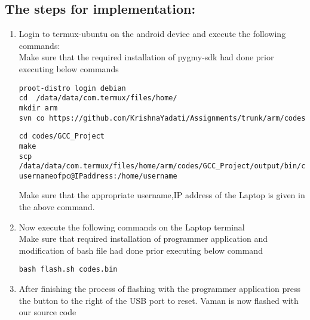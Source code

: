 \documentclass[10pt, a4paper]{article}
\begin{document}
\subsection{The steps for implementation:}
\begin{enumerate}
\item Login to termux-ubuntu on the android device and execute the following commands:\\
Make sure that the required installation of pygmy-sdk had done prior executing below commands
\begin{lstlisting}
proot-distro login debian
cd  /data/data/com.termux/files/home/
mkdir arm
svn co https://github.com/KrishnaYadati/Assignments/trunk/arm/codes
\end{lstlisting}
\begin{lstlisting}
cd codes/GCC_Project
make
scp /data/data/com.termux/files/home/arm/codes/GCC_Project/output/bin/codes.bin usernameofpc@IPaddress:/home/username
\end{lstlisting}
Make sure that the appropriate username,IP address of the Laptop is given in the above command.
\item Now execute the following commands on the Laptop terminal\\
Make sure that required installation of programmer application and modification of bash file had done prior executing below command
\begin{lstlisting}
bash flash.sh codes.bin
\end{lstlisting}
\item After finishing the process of flashing with the programmer application press the button to the right of the USB port to reset. Vaman is now flashed with our source code
\end{enumerate}
\end{document}
